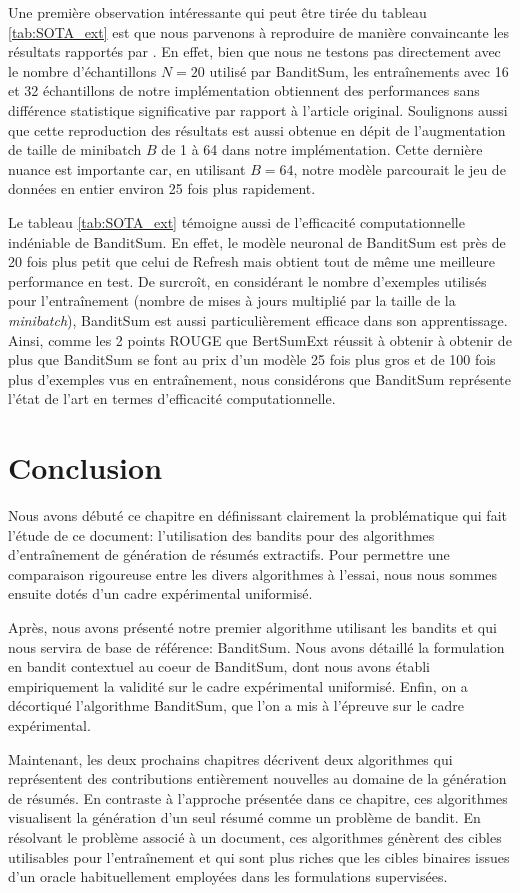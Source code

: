 Une première observation intéressante qui peut être 
tirée du tableau \ref{tab:SOTA_ext} est que nous parvenons 
à reproduire de manière convaincante les résultats rapportés 
par \citet{dong2018banditsum}.
En effet, bien que nous ne testons pas directement avec le nombre 
d'échantillons $N=20$ utilisé par BanditSum, les entraînements
avec 16 et 32 échantillons de notre implémentation obtiennent des performances 
sans différence statistique significative par rapport à l'article original.
Soulignons aussi que cette reproduction des résultats est 
aussi obtenue en dépit de l'augmentation de taille de minibatch $B$ de 1 à 
64 dans notre implémentation.
Cette dernière nuance est importante car, en utilisant $B=64$, notre 
modèle parcourait le jeu de données en entier environ 25 fois 
plus rapidement.

Le tableau \ref{tab:SOTA_ext} témoigne aussi 
de l'efficacité computationnelle indéniable 
de BanditSum.
En effet, le modèle neuronal de BanditSum est près de 20 
fois plus petit que celui de Refresh mais obtient 
tout de même une meilleure performance en test.
De surcroît, en considérant le nombre d'exemples utilisés 
pour l'entraînement (nombre de mises à jours multiplié 
par la taille de la \textit{minibatch}), BanditSum 
est aussi particulièrement efficace dans son apprentissage.
Ainsi, comme les 2 points ROUGE que BertSumExt réussit 
à obtenir à obtenir de plus que BanditSum se font au prix 
d'un modèle 25 fois plus gros et de 100 fois plus d'exemples 
vus en entraînement, nous considérons que BanditSum 
représente l'état de l'art
en termes d'efficacité computationnelle.

\section{Conclusion}

Nous avons débuté ce chapitre en définissant clairement 
la problématique qui fait l'étude de ce document:
l'utilisation des bandits pour des algorithmes 
d'entraînement de génération de résumés extractifs.
Pour permettre une comparaison rigoureuse entre les 
divers algorithmes à l'essai, nous nous sommes ensuite dotés 
d'un cadre expérimental uniformisé.

Après, nous avons présenté notre premier algorithme utilisant les bandits 
et qui nous servira de base de référence: BanditSum.
Nous avons détaillé la formulation en bandit contextuel
au coeur de BanditSum, dont nous avons établi
empiriquement la validité sur le cadre expérimental 
uniformisé.
Enfin, on a décortiqué l'algorithme BanditSum, que l'on a
mis à l'épreuve sur le cadre expérimental.

Maintenant, les deux prochains chapitres décrivent deux algorithmes 
qui représentent des contributions entièrement
nouvelles au domaine de la génération de résumés.
En contraste à l'approche présentée dans ce chapitre, 
ces algorithmes visualisent la génération d'un 
seul résumé comme un problème de bandit.
En résolvant le problème associé à un document,
ces algorithmes génèrent des cibles utilisables 
pour l'entraînement et qui sont plus riches que
les cibles binaires issues d'un oracle habituellement
employées dans les formulations supervisées.